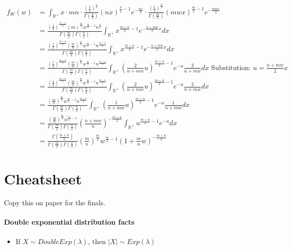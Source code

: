 \documentclass[a4paper]{article}
\newcommand{\rbracket}[1]{\left(#1\right)}
\newcommand{\real}[0]{\mathbb{R}} %
\begin{document}
\begin{align*}
	f_W(w) &= \int_{\real^+} x\cdot mn\cdot \frac{\rbracket{\frac{1}{2}}^{\frac{n}{2}}}{\Gamma\rbracket{\frac{n}{2}}}(nx)^{\frac{n}{2}-1}e^{-\frac{nx}{2}}\cdot \frac{\rbracket{\frac{1}{2}}^{\frac{m}{2}}}{\Gamma\rbracket{\frac{m}{2}}}(mwx)^{\frac{m}{2}-1}e^{-\frac{mwx}{2}}\\
	&= \frac{\rbracket{\frac{1}{2}}^{\frac{m+n}{2}}(m)^{\frac{m}{2}}w^{\frac{m}{2}-1}n^{\frac{n}{2}}}{\Gamma\rbracket{\frac{m}{2}}\Gamma\rbracket{\frac{n}{2}}}\int_{\real^+} x^{\frac{m+n}{2}-1}e^{-\frac{n+mw}{2}x}dx\\
	&= \frac{\rbracket{\frac{1}{2}}^{\frac{m+n}{2}}\rbracket{\frac{m}{n}}^{\frac{m}{2}}w^{\frac{m}{2}-1}n^{\frac{m+n}{2}}}{\Gamma\rbracket{\frac{m}{2}}\Gamma\rbracket{\frac{n}{2}}}\int_{\real^+} x^{\frac{m+n}{2}-1}e^{-\frac{n+mw}{2}x}dx\\
	&= \frac{\rbracket{\frac{1}{2}}^{\frac{m+n}{2}}\rbracket{\frac{m}{n}}^{\frac{m}{2}}w^{\frac{m}{2}-1}n^{\frac{m+n}{2}}}{\Gamma\rbracket{\frac{m}{2}}\Gamma\rbracket{\frac{n}{2}}}\int_{\real^+} \rbracket{\frac{2}{n+mw}u}^{\frac{m+n}{2}-1}e^{-u}\frac{2}{n+mw}dx \text{ Substitution: }u=\frac{n+mw}{2}x\\
	&= \frac{\rbracket{\frac{1}{2}}^{\frac{m+n}{2}}\rbracket{\frac{m}{n}}^{\frac{m}{2}}w^{\frac{m}{2}-1}n^{\frac{m+n}{2}}}{\Gamma\rbracket{\frac{m}{2}}\Gamma\rbracket{\frac{n}{2}}}\int_{\real^+} \rbracket{\frac{2}{n+mw}u}^{\frac{m+n}{2}-1}e^{-u}\frac{2}{n+mw}dx\\
	&= \frac{\rbracket{\frac{m}{n}}^{\frac{m}{2}}w^{\frac{m}{2}-1}n^{\frac{m+n}{2}}}{\Gamma\rbracket{\frac{m}{2}}\Gamma\rbracket{\frac{n}{2}}}\int_{\real^+} \rbracket{\frac{1}{n+mw}u}^{\frac{m+n}{2}-1}e^{-u}\frac{1}{n+mw}dx\\
	&= \frac{\rbracket{\frac{m}{n}}^{\frac{m}{2}}w^{\frac{m}{2}-1}}{\Gamma\rbracket{\frac{m}{2}}\Gamma\rbracket{\frac{n}{2}}}\rbracket{\frac{n+mw}{n}}^{-\frac{m+n}{2}}\int_{\real^+} u^{\frac{m+n}{2}-1}e^{-u}dx\\
	&= \frac{\Gamma\rbracket{\frac{m+n}{2}}}{\Gamma\rbracket{\frac{m}{2}}\Gamma\rbracket{\frac{n}{2}}}\rbracket{\frac{m}{n}}^{\frac{m}{2}}w^{\frac{m}{2}-1}\rbracket{1+\frac{m}{n}w}^{-\frac{m+n}{2}}
\end{align*}

\section{Cheatsheet}
Copy this on paper for the finals.

\paragraph{Double exponential distribution facts}
\begin{itemize}
	\item If $X\sim DoubleExp(\lambda)$, then $|X|\sim Exp(\lambda)$
\end{itemize}
\end{document}

